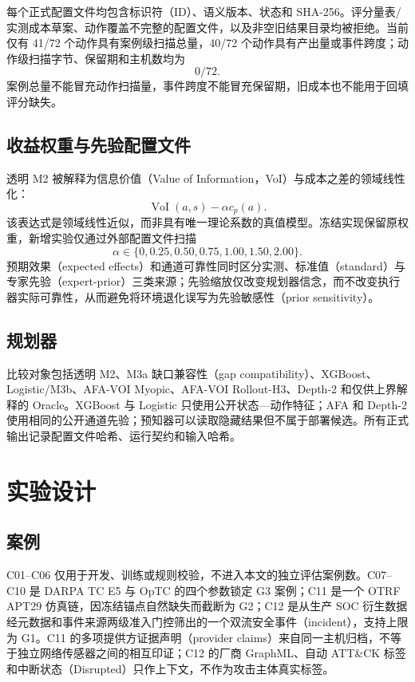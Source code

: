 \documentclass[UTF8,a4paper,twocolumn,zihao=5,fontset=fandol]{ctexart}
\begin{document}
每个正式配置文件均包含标识符（ID）、语义版本、状态和 SHA-256。评分量表/实测成本草案、动作覆盖不完整的配置文件，以及非空旧结果目录均被拒绝。当前仅有 41/72 个动作具有案例级扫描总量，40/72 个动作具有产出量或事件跨度；动作级扫描字节、保留期和主机数均为
\[
0/72.
\]
案例总量不能冒充动作扫描量，事件跨度不能冒充保留期，旧成本也不能用于回填评分缺失。

\subsection{收益权重与先验配置文件}

透明 M2 被解释为信息价值（Value of Information，VoI）与成本之差的领域线性化：
\[
\operatorname{VoI}(a,s)-\alpha c_p(a).
\]
该表达式是领域线性近似，而非具有唯一理论系数的真值模型。冻结实现保留原权重，新增实验仅通过外部配置文件扫描
\[
\alpha\in\{0,0.25,0.50,0.75,1.00,1.50,2.00\}.
\]
预期效果（expected effects）和通道可靠性同时区分实测、标准值（standard）与专家先验（expert-prior）三类来源；先验缩放仅改变规划器信念，而不改变执行器实际可靠性，从而避免将环境退化误写为先验敏感性（prior sensitivity）。

\subsection{规划器}

比较对象包括透明 M2、M3a 缺口兼容性（gap compatibility）、XGBoost、Logistic/M3b、AFA-VOI Myopic、AFA-VOI Rollout-H3、Depth-2 和仅供上界解释的 Oracle。XGBoost 与 Logistic 只使用公开状态—动作特征；AFA 和 Depth-2 使用相同的公开通道先验；预知器可以读取隐藏结果但不属于部署候选。所有正式输出记录配置文件哈希、运行契约和输入哈希。


\section{实验设计}

\subsection{案例}

C01--C06 仅用于开发、训练或规则校验，不进入本文的独立评估案例数。C07--C10 是 DARPA TC E5 与 OpTC 的四个参数锁定 G3 案例；C11 是一个 OTRF APT29 仿真链，因冻结锚点自然缺失而截断为 G2；C12 是从生产 SOC 衍生数据经元数据和事件来源两级准入门控筛出的一个双流安全事件（incident），支持上限为 G1。C11 的多项提供方证据声明（provider claims）来自同一主机归档，不等于独立网络传感器之间的相互印证；C12 的厂商 GraphML、自动 ATT\&CK 标签和中断状态（Disrupted）只作上下文，不作为攻击主体真实标签。
\end{document}
